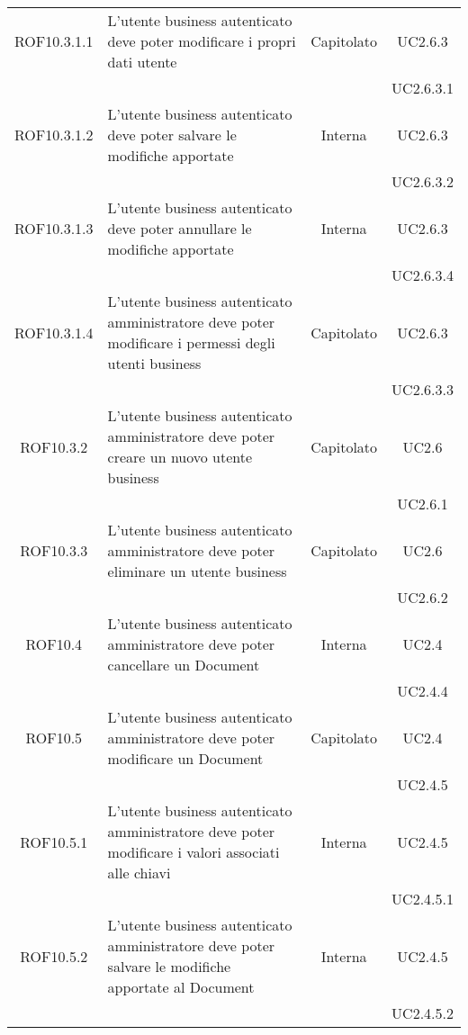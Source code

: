 \begin{longtable}{|c|p{6cm}|c|c|}
\midrule
ROF10.3.1.1
& L'utente business autenticato deve poter modificare i propri dati utente
& Capitolato
& UC2.6.3\\
& & & UC2.6.3.1
\\

\midrule
ROF10.3.1.2
& L'utente business autenticato deve poter  salvare le modifiche apportate
& Interna
& UC2.6.3\\
& & & UC2.6.3.2
\\

\midrule
ROF10.3.1.3
& L'utente business autenticato deve poter annullare le modifiche apportate
& Interna
& UC2.6.3\\
& & & UC2.6.3.4
\\

\midrule
ROF10.3.1.4
& L'utente business autenticato amministratore deve poter modificare i permessi degli utenti business
& Capitolato
& UC2.6.3\\
& & & UC2.6.3.3
\\

\midrule
ROF10.3.2
& L'utente business autenticato amministratore deve poter creare un nuovo utente business
& Capitolato
& UC2.6\\
& & & UC2.6.1
\\

\midrule
ROF10.3.3
& L'utente business autenticato amministratore deve poter eliminare un utente business
& Capitolato
& UC2.6\\
& & & UC2.6.2
\\

\midrule
ROF10.4
& L'utente business autenticato amministratore deve poter cancellare un Document
& Interna
& UC2.4\\
& & & UC2.4.4
\\

\midrule
ROF10.5
& L'utente business autenticato amministratore deve poter modificare un Document
& Capitolato
& UC2.4\\
& & & UC2.4.5
\\

\midrule
ROF10.5.1
& L'utente business autenticato amministratore deve poter modificare i valori associati alle chiavi
& Interna
& UC2.4.5\\
& & & UC2.4.5.1
\\

\midrule
ROF10.5.2
& L'utente business autenticato amministratore deve poter salvare le modifiche apportate al Document
& Interna
& UC2.4.5\\
& & & UC2.4.5.2
\\


\end{longtable}
